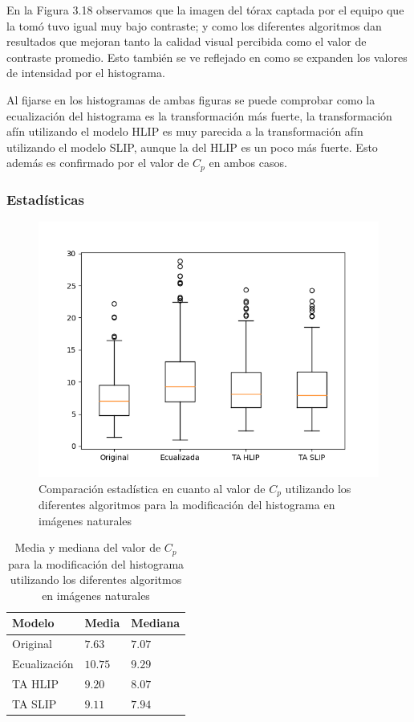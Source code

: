 En la Figura 3.18 observamos que la imagen del t\'orax captada por el equipo que la tom\'o tuvo igual muy bajo contraste; y como los diferentes algoritmos dan resultados que mejoran tanto la calidad visual percibida como el valor de contraste promedio. Esto tambi\'en se ve reflejado en como se expanden los valores de intensidad por el histograma.

Al fijarse en los histogramas de ambas figuras se puede comprobar como la ecualizaci\'on del histograma es la transformaci\'on m\'as fuerte, la transformaci\'on af\'in utilizando el modelo HLIP  es muy parecida a la transformaci\'on af\'in utilizando el modelo SLIP, aunque la del HLIP es un poco m\'as fuerte. Esto adem\'as es confirmado por el valor de $C_p$ en ambos casos.

\subsubsection{Estad\'isticas}

\begin{figure}
	\begin{center}
		\includegraphics[width=10.0 cm]{images/graphics/natural/affine_transform/eq_all.png}
		\caption{Comparaci\'on estad\'istica en cuanto al valor de $C_p$ utilizando los diferentes algoritmos para la modificaci\'on del histograma en im\'agenes naturales}
	\end{center}
\end{figure}

\begin{table}
	\begin{center}
		\begin{tabular}{|l|l|l|}
			\hline 
			Modelo & Media & Mediana\\
			\hline
			Original & $7.63$ & $7.07$\\
			\hline
			Ecualizaci\'on & $10.75$ & $9.29$\\
			\hline
			TA HLIP & $9.20$ & $8.07$\\
			\hline
			TA SLIP & $9.11$ & $7.94$\\
			\hline
		\end{tabular}
		\caption{Media y mediana del valor de $C_p$ para la modificaci\'on del histograma utilizando los diferentes algoritmos en im\'agenes naturales}
	\end{center}
\end{table}

